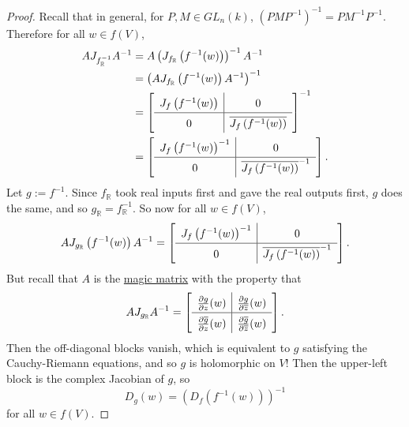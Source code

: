 \documentclass[12pt]{article}
\newcommand{\real}{\mathbb{R}}
\newcommand\inv[1]{#1^{-1}}
\newcommand{\paren}[1]{\left( #1 \right)}
\theoremstyle{definition}
\theoremstyle{remark}
\begin{document}
\begin{proof}
    Recall that in general, for $P, M \in GL_n(k)$, $\inv{ \paren{P M \inv{P} } } = P \inv{M} \inv{P}$. Therefore for all $w \in f(V)$,
    \begin{align*}
        A J_{ \inv{ f_{\real} } } \inv{A} & = A \inv{ \paren{ J_{ f_{\real} } \paren{ \inv{f}(w) } } } \inv{A} \\
        & = \inv{ \paren{ A J_{f_{\real}} \paren{ \inv{f}(w) } \inv{A} } } \\
        & = \inv{ \left[ 
            \def\arraystretch{1.5}
            \begin{array}{c|c}
                J_f \paren{ \inv{f}(w) } & 0 \\
                \hline
                0 & \overline{J_f \paren{ \inv{f}(w) } }
            \end{array}
        \right] } \\
        & = \left[ 
            \def\arraystretch{1.5}
            \begin{array}{c|c}
                \inv{ J_f \paren{ \inv{f}(w) } } & 0 \\
                \hline
                0 & \inv{ \overline{J_f \paren{ \inv{f}(w) } } }
            \end{array}
        \right].
    \end{align*}
    Let $g := \inv{f}$. Since $f_{\real}$ took real inputs first and gave the real outputs first, $g$ does the same, and so $g_{\real} = \inv{f_{\real}}$. So now for all $w \in f(V)$,
    \[
        A J_{g_{\real}} \paren{ \inv{f}(w) } \inv{A} = 
        \left[ 
            \def\arraystretch{1.5}
            \begin{array}{c|c}
                \inv{ J_f \paren{ \inv{f}(w) } } & 0 \\
                \hline
                0 & \inv{ \overline{J_f \paren{ \inv{f}(w) } } }
            \end{array}
        \right].
    \]
    But recall that $A$ is the \underline{magic matrix} with the property that
    \[
        A J_{g_{\real}} \inv{A} = 
        \left[ 
            \def\arraystretch{1.5}
            \begin{array}{c|c}
                \frac{\partial g}{\partial z}(w) & \frac{\partial g}{\partial \overline{z}}(w) \\
                \hline
                \frac{\partial \overline{g}}{\partial z}(w) & \frac{\partial \overline{g}}{\partial \overline{z}}(w)
            \end{array}
        \right].
    \]
    Then the off-diagonal blocks vanish, which is equivalent to $g$ satisfying the Cauchy-Riemann equations, and so $g$ is holomorphic on $V$! Then the upper-left block is the complex Jacobian of $g$, so 
    \[
        D_g(w) = \inv{ \paren{ D_f \paren{ \inv{f}(w) } } }
    \]
    for all $w \in f(V)$.
\end{proof}
\end{document}
